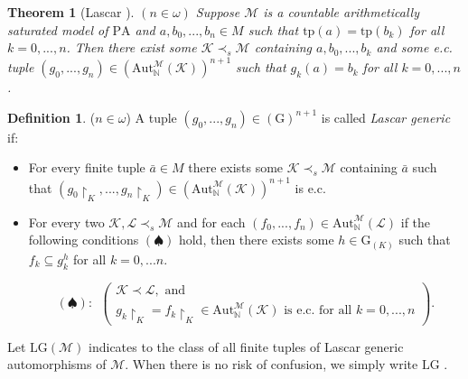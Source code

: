 \documentclass[11pt]{article}
\newtheorem{theorem}{Theorem}[section]
\theoremstyle{plain}
\theoremstyle{definition}
\newtheorem{dfn}{Definition}
\newcommand{\M}{\mathcal{M}}
\newcommand{\K}{\mathcal{K}}
\newcommand{\NN}{\mathbb{N}}
\newcommand{\G}{\mathrm{G}}
\newcommand{\A}{\mathrm{Aut}}
\newcommand{\pa}{\mathrm{PA}}
\newcommand{\LG}{\mathrm{LG}}
\newcommand{\tp}{\mathrm{tp}}
\begin{document}
\begin{theorem}[Lascar \cite{las}]
$(n\in\omega)$ Suppose $ \M $ is a countable  arithmetically saturated model of $ \pa $ and $ a,b_{0},...,b_{n}\in M $ such that $ \tp(a)=\tp(b_{k}) $ for all $k=0,...,n$. Then there exist some $ \K\prec_{s}\M $ containing $ a,b_{0},...,b_{k} $ and some e.c. tuple $ (g_{0},...,g_{n})\in(\A_{\NN}^{\M}(\K))^{n+1} $ such that  $ g_{k}(a)=b_{k} $ for all $k=0,...,n$.
\end{theorem}

\begin{dfn}
($n\in\omega$)	A tuple $ (g_{0},...,g_{n})\in(\G)^{n+1} $ is called \textit{Lascar generic} if:
	\begin{itemize}
		\item[(i)] For every finite tuple $ \bar{a}\in M $ there exists some  $ \K\prec_{s}\M $ containing $ \bar{a}$ such that $ (g_{0}\upharpoonright_{K},...,g_{n}\upharpoonright_{K})\in(\A_{\NN}^{\M}(\K))^{n+1}  $ is e.c.
		\item[(ii)] For every two $ \K,\mathcal{L}\prec_{s}\M $ and  for each $ (f_{0},...,f_{n})\in\A_{\NN}^{\M}(\mathcal{L}) $ if  the following conditions $(\spadesuit)$ hold, then there exists some $ h\in\G_{(K)} $ such that $ f_{k}\subseteq g_{k}^{h} $ for all $k=0,...n$.
		
	$$(\spadesuit): \ \ \left(\begin{array}{c}
	\K\prec\mathcal{L}, \text{ and }	\\
	{g_{k}\upharpoonright_{K}=f_{k}\upharpoonright_{K}\in\A_{\NN}^{\M}(\K) }  \text{ is e.c. for all } k=0,...,n
	\end{array}\right).$$
	\end{itemize}
Let $ \LG(\M) $ indicates to the class of all finite tuples of Lascar generic automorphisms of $ \M $. When there is no risk of confusion, we simply write $ \LG $ .
\end{dfn}
\end{document}

